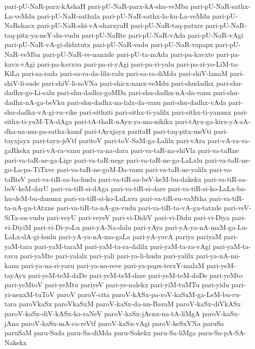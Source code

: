 {pari-pU-NaR-parx-kAshaH
pari-pU-NaR-parx-kA-sha-veMba
pari-pU-NaR-sathx-La-veMdu
pari-pU-NaR-sathxla
pari-pU-NaR-sathx-la-ku-La-veMdu
pari-pU-NaRshacx
pari-pU-NaR-shi-vA-sharxyaH
pari-pU-NaR-taq-patxre
pari-pU-NaR-taq-pitx-ya-neY-du-vudu
pari-pU-NaRte
pari-pU-NaR-vAda
pari-pU-NaR-vAgi
pari-pU-NaR-vA-gi-didxtutx
pari-pU-NaR-vadu
pari-pU-NaR-vapapx
pari-pU-NaR-veMba
pari-pU-NaR-ve-nanxde
pari-pU-ta-mAda
pari-pa-kavxte
pari-pa-kavx-vAgi
pari-pa-kavxva
pari-pa-ri-yAgi
pari-pa-ri-yalu
pari-pa-ri-yo-LiM-ta-KiLa
pari-sa-rada
pari-sa-ra-da-lilx-ralu
pari-sa-ra-diMda
pari-shiV-lanaM
pari-shiV-li-sade
pari-shiV-li-soVNa
pari-shicx-nanx-veMdu
pari-shudadhx
pari-shu-dadhx-go-Li-salu
pari-shu-dadhx-goMDa
pari-shu-dadhx-nA-da-vanu
pari-shu-dadhx-nA-ga-beVku
pari-shu-dadhx-na-lalx-da-vanu
pari-shu-dadhx-vAda
pari-shu-dadhx-vA-gi-ru-vike
pari-sithxti
pari-sithx-ti-yalilx
pari-sithx-ti-yanunx
pari-sithx-ti-yuM-TA-dAga
pari-tA-thaR-nAyx-ya-ma-nikikx
pari-tAyx-ga-kirx-yA-sA-dha-na-mu-pa-sathx-kamf
pari-tAyxjayx
paritaH
pari-taq-pitx-meVti
pari-tayxjayx
pari-tayx-jeVtf
paritoV
pari-toV-SaM-ga-Lalilx
pari-vAra
pari-vA-ra-va-gaRkekx
pari-vA-ra-vanu
pari-va-na-dara
pari-va-taR-na-shiVla
pari-va-taRne
pari-va-taR-ne-ga-Lige
pari-va-taR-nege
pari-va-taR-ne-go-LaLxlu
pari-va-taR-ne-go-La-pa-TiTxve
pari-va-taR-ne-goM-Da-vanu
pari-va-taR-ne-yalilx
pari-va-taRteV
pari-va-tiR-sa-ba-hudu
pari-va-tiR-sa-beV-keM-bu-dakekx
pari-va-tiR-sa-beV-keM-darU
pari-va-tiR-si-dAga
pari-va-tiR-si-dare
pari-va-tiR-si-ko-LaLx-ba-hu-deM-bu-danunx
pari-va-tiR-si-ko-LuLxva
pari-va-tiR-su-vaMtha
pari-va-tiR-ta-nA-gu-tAtxne
pari-va-tiR-ta-nA-gu-vudu
pari-va-tiR-ta-vA-gu-tatxde
pari-veV-SiTx-su-vudu
pari-veyU
pari-veyeV
pari-vi-DidiV
pari-vi-Didu
pari-vi-Diya
pari-vi-DiyiM
pari-vi-Di-yoLu
pari-yA-Na-dalu
pari-yAya
pari-yA-ya-nA-maM-ga-Lu-LaLx-dA-gi-hudu
pari-yA-ya-nA-ma-gaLa
pari-yA-yavA
pariya
pariyaM
pari-yaM-tara
pari-yaM-taraM
pari-yaM-ta-ra-dalilx
pari-yaM-ta-ra-vAgi
pari-yaM-ta-ravu
pari-yaMte
pari-yalalx
pari-yali
pari-ya-li-hudu
pari-yalilx
pari-ya-nA-mi-kanu
pari-ya-na-ri-yaru
pari-ya-no-reve
pari-ya-papx-terxY-malaM
pari-yeM-tayAyx
pari-yeM-teM-daDe
pari-yeM-teM-dare
pari-yeM-teM-doDe
pari-yeMto
pari-yeMtoV
pari-yeMtu
pariyeV
pari-ye-nalekx
pari-yiM-tuMTu
pari-yidu
pari-yi-nenxM-tuToV
paroV
paroV-cita
paroV-kASx-pa-roV-kaSxM-ga-LeM-bu-ru-tara
paroVkaSx
paroVkaSxM
paroV-kaSx-da-nu-BavaM
paroV-kaSx-diVkASx
paroV-kaSx-diV-kASx-ka-raNeV
paroV-kaSx-jAcnx-na-tA-liMgA
paroV-kaSx-jAna
paroV-kaSx-mA-ca-reVtf
paroV-kaSx-vAgi
paroV-keSxVNa
paruSa
paruSaM
paru-Sada
paru-Sa-diMda
paru-Sakekx
paru-Sa-liMga
paru-Sa-pA-SA-Nakekx
}
